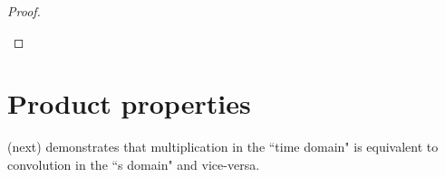 \begin{proof}
\begin{enumerate}
\end{enumerate}
\end{proof}

\section{Product properties}
\label{sec:opLT_conv}
 (next) demonstrates that multiplication in the ``time domain"
is equivalent to convolution in the ``s domain" and
vice-versa.

